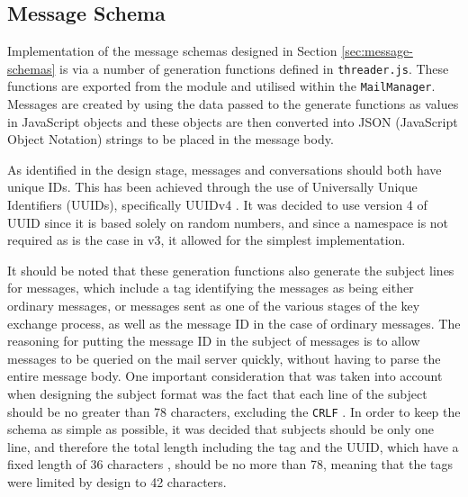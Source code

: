 \subsection{Message Schema}\label{sec:message-schema-implementation}
Implementation of the message schemas designed in Section \ref{sec:message-schemas} is via a number of generation functions defined in \verb|threader.js|. These functions are exported from the module and utilised within the \verb|MailManager|. Messages are created by using the data passed to the generate functions as values in  JavaScript objects and these objects are then converted into JSON (JavaScript Object Notation) \cite{json-rfc} strings to be placed in the message body. 

As identified in the design stage, messages and conversations should both have unique IDs. This has been achieved through the use of Universally Unique Identifiers (UUIDs), specifically UUIDv4 \cite{uuid-rfc}. It was decided to use version 4 of UUID since it is based solely on random numbers, and since a namespace is not required as is the case in v3, it allowed for the simplest implementation.

It should be noted that these generation functions also generate the subject lines for messages, which include a tag identifying the messages as being either ordinary messages, or messages sent as one of the various stages of the key exchange process, as well as the message ID in the case of ordinary messages. The reasoning for putting the message ID in the subject of messages is to allow messages to be queried on the mail server quickly, without having to parse the entire message body. One important consideration that was taken into account when designing the subject format was the fact that each line of the subject should be no greater than 78 characters, excluding the \verb|CRLF| \cite{internet-message-format-rfc}. In order to keep the schema as simple as possible, it was decided that subjects should be only one line, and therefore the total length including the tag and the UUID, which have a fixed length of 36 characters \cite{uuid-rfc}, should be no more than 78, meaning that the tags were limited by design to 42 characters.
